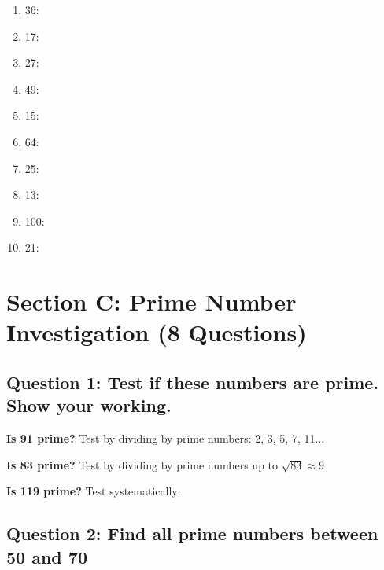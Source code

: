 \documentclass{article}
\begin{document}
\begin{enumerate}
    \item 36: \underline{\hspace{8cm}}
    \item 17: \underline{\hspace{8cm}}
    \item 27: \underline{\hspace{8cm}}
    \item 49: \underline{\hspace{8cm}}
    \item 15: \underline{\hspace{8cm}}
    \item 64: \underline{\hspace{8cm}}
    \item 25: \underline{\hspace{8cm}}
    \item 13: \underline{\hspace{8cm}}
    \item 100: \underline{\hspace{8cm}}
    \item 21: \underline{\hspace{8cm}}
\end{enumerate}

\section{Section C: Prime Number Investigation (8 Questions)}

\subsection*{Question 1: Test if these numbers are prime. Show your working.}

\textbf{Is 91 prime?}
Test by dividing by prime numbers: 2, 3, 5, 7, 11...

\vspace{2cm}

\textbf{Is 83 prime?}
Test by dividing by prime numbers up to $\sqrt{83} \approx 9$

\vspace{2cm}

\textbf{Is 119 prime?}
Test systematically:

\vspace{2cm}

\subsection*{Question 2: Find all prime numbers between 50 and 70}
\end{document}
